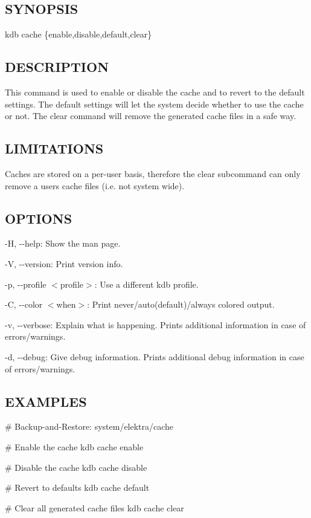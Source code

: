 \subsection*{S\+Y\+N\+O\+P\+S\+IS}

{\ttfamily kdb cache \{enable,disable,default,clear\}}

\subsection*{D\+E\+S\+C\+R\+I\+P\+T\+I\+ON}

This command is used to enable or disable the cache and to revert to the default settings. The default settings will let the system decide whether to use the cache or not. The clear command will remove the generated cache files in a safe way.

\subsection*{L\+I\+M\+I\+T\+A\+T\+I\+O\+NS}

Caches are stored on a per-\/user basis, therefore the {\ttfamily clear} subcommand can only remove a user\textquotesingle{}s cache files (i.\+e. not system wide).

\subsection*{O\+P\+T\+I\+O\+NS}


\begin{DoxyItemize}
\item {\ttfamily -\/H}, {\ttfamily -\/-\/help}\+: Show the man page.
\item {\ttfamily -\/V}, {\ttfamily -\/-\/version}\+: Print version info.
\item {\ttfamily -\/p}, {\ttfamily -\/-\/profile $<$profile$>$}\+: Use a different kdb profile.
\item {\ttfamily -\/C}, {\ttfamily -\/-\/color $<$when$>$}\+: Print never/auto(default)/always colored output.
\item {\ttfamily -\/v}, {\ttfamily -\/-\/verbose}\+: Explain what is happening. Prints additional information in case of errors/warnings.
\item {\ttfamily -\/d}, {\ttfamily -\/-\/debug}\+: Give debug information. Prints additional debug information in case of errors/warnings.
\end{DoxyItemize}

\subsection*{E\+X\+A\+M\+P\+L\+ES}


\begin{DoxyCode}
# Backup-and-Restore: system/elektra/cache

# Enable the cache
kdb cache enable

# Disable the cache
kdb cache disable

# Revert to defaults
kdb cache default

# Clear all generated cache files
kdb cache clear
\end{DoxyCode}
 